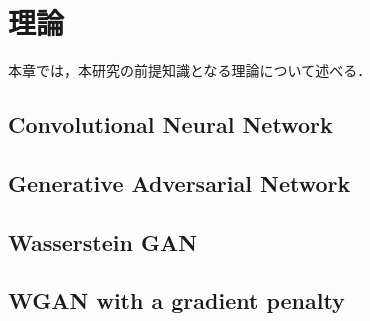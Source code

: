 \documentclass[\homedir/main.tex]{subfiles}
\begin{document}
\setcounter{chapter}{2}
\chapter{理論}\label{chap:theories}
本章では，本研究の前提知識となる理論について述べる．

\section{Convolutional Neural Network}%


\section{Generative Adversarial Network}%


\section{Wasserstein GAN}%


\section{WGAN with a gradient penalty}%


\printBibForSubfiles
\end{document}
